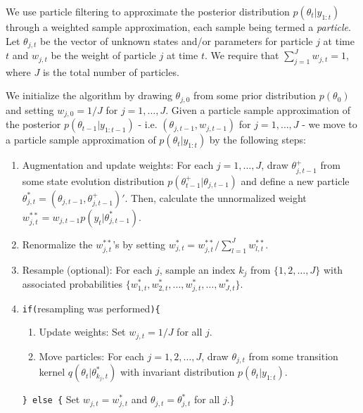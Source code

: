 \documentclass{article}
\begin{document}
We use particle filtering to approximate the posterior distribution $p(\theta_t|y_{1:t})$ through a weighted sample approximation, each sample being termed a \emph{particle}. Let $\theta_{j,t}$ be the vector of unknown states and/or parameters for particle $j$ at time $t$ and $w_{j,t}$ be the weight of particle $j$ at time $t$. We require that $\sum_{j=1}^J w_{j,t} = 1$, where $J$ is the total number of particles.

We initialize the algorithm by drawing $\theta_{j,0}$ from some prior distribution $p(\theta_0)$ and setting $w_{j,0} = 1 / J$ for $j = 1,\ldots,J$. Given a particle sample approximation of the posterior $p(\theta_{t-1}|y_{1:t-1})$ - i.e. $\left(\theta_{j,t-1}, w_{j,t-1}\right)$ for $j=1,\ldots,J$ - we move to a particle sample approximation of $p(\theta_t|y_{1:t})$ by the following steps:

\begin{enumerate}
\item Augmentation and update weights: For each $j = 1,\ldots,J$, draw $\theta^{+}_{j,t-1}$ from some state evolution distribution $p(\theta^{+}_{t-1}|\theta_{j,t-1})$ and define a new particle $\theta^{*}_{j,t} = (\theta_{j,t-1},\theta^{+}_{j,t-1})'$. Then, calculate the unnormalized weight $w^{**}_{j,t} = w_{j,t-1}p(y_t|\theta^{*}_{j,t-1})$.
\item Renormalize the $w^{**}_{j,t}$'s by setting $w^{*}_{j,t} = w^{**}_{j,t} / \sum_{l=1}^J w^{**}_{l,t}$.
\item Resample (optional): For each $j$, sample an index $k_j$ from $\{1,2,\ldots,J\}$ with associated probabilities $\{w^{*}_{1,t},w^{*}_{2,t},\ldots,w^{*}_{j,t},\ldots,w^{*}_{J,t}\}$.
\item {\tt if(}resampling was performed{\tt )\{} \\
\begin{enumerate}[label=\alph*.]
\item Update weights: Set $w_{j,t} = 1 / J$ for all $j$.
\item Move particles: For each $j = 1,2,\ldots,J$, draw $\theta_{j,t}$ from some transition kernel $q(\theta_t|\theta^{*}_{k_j,t})$ with invariant distribution $p(\theta_t|y_{1:t})$.
\end{enumerate}
{\tt \} else \{} Set $w_{j,t} = w^{*}_{j,t}$ and $\theta_{j,t} = \theta^{*}_{j,t}$ for all $j$.\}
\end{enumerate}
\end{document}

